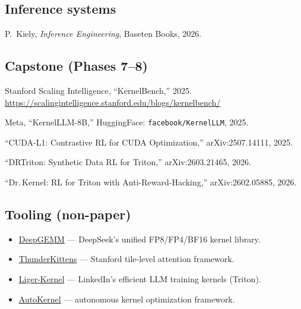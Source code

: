 \documentclass[11pt, letterpaper]{article}
\begin{document}
\subsection*{Inference systems}
\begin{enumerate}[resume, label={[\arabic*]}]
\item P.~Kiely, \textit{Inference Engineering}, Baseten Books, 2026.
\end{enumerate}

\subsection*{Capstone (Phases 7--8)}
\begin{enumerate}[resume, label={[\arabic*]}]
\item Stanford Scaling Intelligence, ``KernelBench,'' 2025. \url{https://scalingintelligence.stanford.edu/blogs/kernelbench/}
\item Meta, ``KernelLLM-8B,'' HuggingFace: \texttt{facebook/KernelLLM}, 2025.
\item ``CUDA-L1: Contrastive RL for CUDA Optimization,'' arXiv:2507.14111, 2025.
\item ``DRTriton: Synthetic Data RL for Triton,'' arXiv:2603.21465, 2026.
\item ``Dr.\,Kernel: RL for Triton with Anti-Reward-Hacking,'' arXiv:2602.05885, 2026.
\end{enumerate}

\subsection*{Tooling (non-paper)}
\begin{itemize}
\item \href{https://github.com/deepseek-ai/DeepGEMM}{DeepGEMM} --- DeepSeek's unified FP8/FP4/BF16 kernel library.
\item \href{https://github.com/HazyResearch/ThunderKittens}{ThunderKittens} --- Stanford tile-level attention framework.
\item \href{https://github.com/linkedin/Liger-Kernel}{Liger-Kernel} --- LinkedIn's efficient LLM training kernels (Triton).
\item \href{https://github.com/RightNow-AI/autokernel}{AutoKernel} --- autonomous kernel optimization framework.
\end{itemize}
\end{document}
